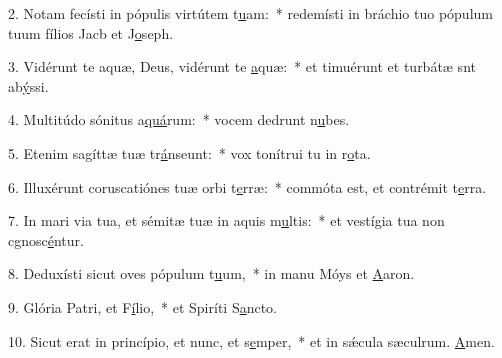 2. Notam fecísti in pópulis virtútem t\uline{u}am:~* redemísti in bráchio tuo pópulum tuum fílios Jacb et J\uline{o}seph.\par 
3. Vidérunt te aquæ, Deus, vidérunt te \uline{a}quæ:~* et timuérunt et turbátæ snt ab\uline{ý}ssi.\par 
4. Multitúdo sónitus a\uline{quá}rum:~* vocem dedrunt n\uline{u}bes.\par 
5. Etenim sagíttæ tuæ tr\uline{á}nseunt:~* vox tonítrui tu in r\uline{o}ta.\par 
6. Illuxérunt coruscatiónes tuæ orbi t\uline{e}rræ:~* commóta est, et contrémit t\uline{e}rra.\par 
7. In mari via tua, et sémitæ tuæ in aquis m\uline{u}ltis:~* et vestígia tua non cgnosc\uline{é}ntur.\par 
8. Deduxísti sicut oves pópulum t\uline{u}um,~* in manu Móys et \uline{A}aron.\par 
9. Glória Patri, et F\uline{í}lio,~* et Spiríti S\uline{a}ncto.\par 
10. Sicut erat in princípio, et nunc, et s\uline{e}mper,~* et in sǽcula sæculrum. \uline{A}men.\par 
